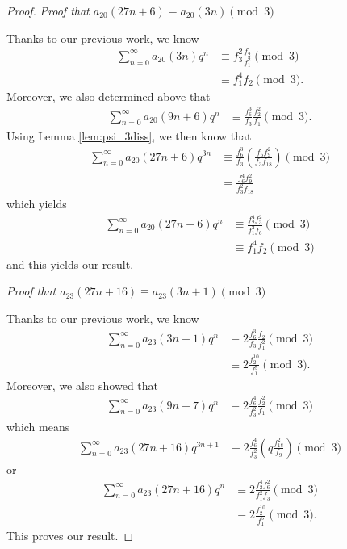 \documentclass[10pt, reqno]{amsart}
\theoremstyle{theorem}
\theoremstyle{definition}
\theoremstyle{example}
\begin{document}
\begin{proof}
\bigskip  

\noindent
{\it Proof that $a_{20}(27n+6) \equiv a_{20}(3n) \pmod{3}$}

\bigskip 

\noindent 
Thanks to our previous work, we know 
\begin{align*}
\sum_{n=0}^\infty a_{20}(3n)q^{n} 
&\equiv 
f_3^2\frac{f_2}{f_1^2} \pmod{3} \\
&\equiv 
f_1^4f_2 \pmod{3}.
\end{align*}
Moreover, we also determined above that 
\begin{align*}
\sum_{n=0}^\infty a_{20}(9n+6)q^{n} 
&\equiv 
\frac{f_6^3}{f_3}\frac{f_2^2}{f_1} \pmod{3}.
\end{align*}
Using Lemma \ref{lem:psi_3diss}, we then know that 
\begin{align*}
\sum_{n=0}^\infty a_{20}(27n+6)q^{3n} 
&\equiv 
\frac{f_6^3}{f_3}\left(  \frac{f_6f_9^2}{f_3f_{18}} \right) \pmod{3} \\
&= 
\frac{f_6^4f_9^2}{f_3^2f_{18}}  
\end{align*}
which yields 
\begin{align*}
\sum_{n=0}^\infty a_{20}(27n+6)q^{n} 
&\equiv  
\frac{f_2^4f_3^2}{f_1^2f_{6}}   \pmod{3} \\
&\equiv 
f_1^4f_2 \pmod{3}
\end{align*}
and this yields our result.  

\bigskip  

\noindent
{\it Proof that $a_{23}(27n+16) \equiv a_{23}(3n+1) \pmod{3}$}

\bigskip 

\noindent 
Thanks to our previous work, we know 
\begin{align*}
\sum_{n=0}^\infty a_{23}(3n+1)q^{n} 
&\equiv 
2\frac{f_6^3}{f_3}\frac{f_2}{f_1^2} \pmod{3} \\
&\equiv 
2\frac{f_2^{10}}{f_1^5} \pmod{3}.  
\end{align*}
Moreover, we also showed that 
\begin{align*}
\sum_{n=0}^\infty a_{23}(9n+7)q^{n} 
&\equiv 
2\frac{f_6^4}{f_3^2}\frac{f_2^2}{f_1} \pmod{3}
\end{align*}
which means 
\begin{align*}
\sum_{n=0}^\infty a_{23}(27n+16)q^{3n+1} 
&\equiv 
2\frac{f_6^4}{f_3^2}\left(  q\frac{f_{18}^2}{f_9}  \right) \pmod{3}
\end{align*}
or 
\begin{align*}
\sum_{n=0}^\infty a_{23}(27n+16)q^{n} 
&\equiv 
2\frac{f_2^4f_{6}^2}{f_1^2f_3}   \pmod{3} \\
&\equiv 
2\frac{f_2^{10}}{f_1^5} \pmod{3}.
\end{align*}
This proves our result.  


\end{proof}
\end{document}
